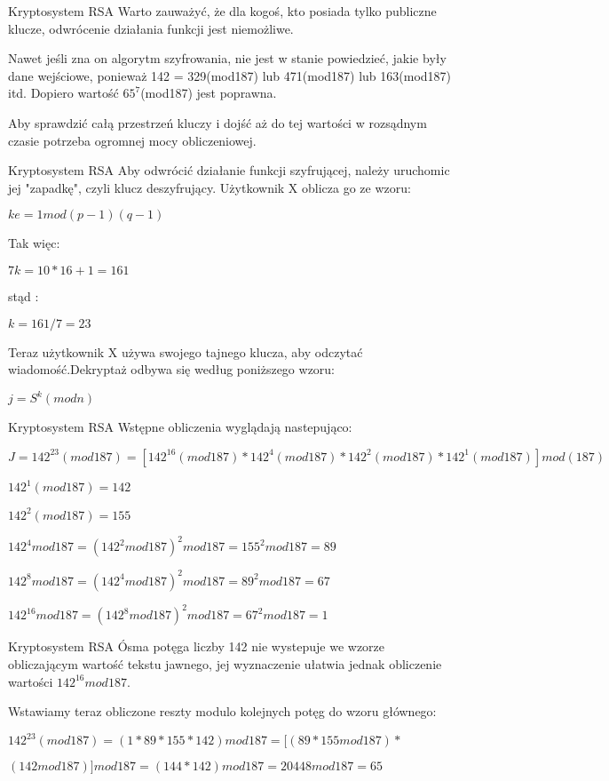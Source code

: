 \documentclass[10pt]{beamer}
\begin{document}
\begin{frame}{Kryptosystem RSA}
  Warto zauważyć, że dla kogoś, kto posiada tylko publiczne klucze, odwrócenie działania funkcji jest niemożliwe.
  
   Nawet jeśli zna on algorytm szyfrowania, nie jest w stanie powiedzieć, jakie były dane wejściowe, ponieważ 142 = 329(mod187) lub 471(mod187) lub 163(mod187) itd. Dopiero wartość $65^7$(mod187) jest poprawna.
   
    Aby sprawdzić całą przestrzeń kluczy i dojść aż do tej wartości w rozsądnym czasie potrzeba ogromnej mocy obliczeniowej.
\end{frame}
\begin{frame}{Kryptosystem RSA}
  Aby odwrócić działanie funkcji szyfrującej, należy uruchomic jej "zapadkę", czyli klucz deszyfrujący. Użytkownik X oblicza go ze wzoru:
  
  $ke=1mod(p-1)(q-1)$
  
  Tak więc:
  
  $7k = 10*16+1=161$
  
  stąd :
  
  $k=161/7=23$
  
  Teraz użytkownik X używa swojego tajnego klucza, aby odczytać wiadomość.Dekryptaż odbywa się według poniższego wzoru:
  
  $j=S^k(modn)$
  
\end{frame}

\begin{frame}{Kryptosystem RSA}
  Wstępne obliczenia wyglądają nastepująco:
  
  $J=142^{23}(mod187)=[142^{16}(mod187)*142^4(mod187)*142^2(mod187)*
  142^1(mod187)]mod(187)$
  
  
  $142^1(mod187)=142$
  
  $142^2(mod187)=155$
  
  $142^4mod187=(142^2mod187)^2mod187=155^2mod187=89$
  
  $142^8mod187=(142^4mod187)^2mod187=89^2mod187=67$
  
  $142^{16}mod187=(142^8mod187)^2mod187=67^2mod187=1$
\end{frame}

\begin{frame}{Kryptosystem RSA}
  Ósma potęga liczby 142 nie wystepuje we wzorze obliczającym wartość tekstu jawnego, jej wyznaczenie ułatwia jednak obliczenie wartości $142^{16}mod187$.
  
   Wstawiamy teraz obliczone reszty modulo kolejnych potęg do wzoru głównego:
  
  $142^{23}(mod187)=(1*89*155*142)mod187=[(89*155mod187)*$
  
  
  $(142mod187)]mod187=(144*142)mod187=20448mod187=65$
\end{frame}
\end{document}
